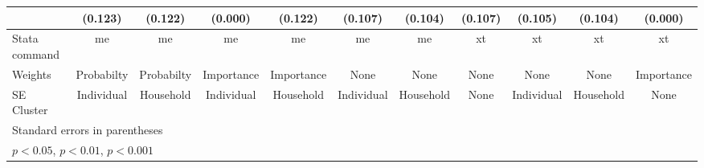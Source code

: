 {\begin{tabular}{l*{10}{c}}
                &  (0.123)         &  (0.122)         &  (0.000)         &  (0.122)         &  (0.107)         &  (0.104)         &  (0.107)         &  (0.105)         &  (0.104)         &  (0.000)         \\
\midrule
Stata command   &       me         &       me         &       me         &       me         &       me         &       me         &       xt         &       xt         &       xt         &       xt         \\
Weights         &Probabilty         &Probabilty         &Importance         &Importance         &     None         &     None         &     None         &     None         &     None         &Importance         \\
SE Cluster      &Individual         &Household         &Individual         &Household         &Individual         &Household         &     None         &Individual         &Household         &     None         \\
\bottomrule
\multicolumn{11}{l}{\footnotesize Standard errors in parentheses}\\
\multicolumn{11}{l}{\footnotesize \sym{*} \(p<0.05\), \sym{**} \(p<0.01\), \sym{***} \(p<0.001\)}\\
\end{tabular}
}
